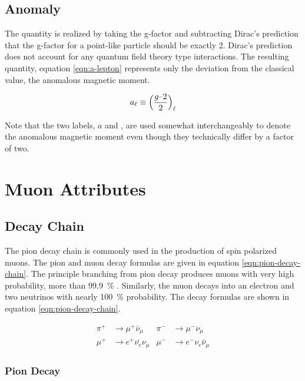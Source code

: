 \subsection{Anomaly}
The quantity \gmtwo is realized by taking the g-factor and subtracting Dirac's prediction that the g-factor for a point-like particle should be exactly 2.  Dirac's prediction does not account for any quantum field theory type interactions.  The resulting \gmtwo quantity, equation \ref{eqn:a-lepton} represents only the deviation from the classical value, the anomalous magnetic moment.

\begin{equation}
\label{eqn:a-lepton}
a_{\ell} \equiv \Big(\frac{g\hbox{--}2}{2} \Big)_\ell
\end{equation}

\noindent
Note that the two labels, $a$ and \gmtwo, are used somewhat interchangeably to denote the anomalous magnetic moment even though they technically differ by a factor of two.

\section{Muon Attributes} \label{sec:muon-attributes}

\subsection{Decay Chain}

The pion decay chain is commonly used in the production of spin polarized muons.  The pion and muon decay formulas are given in equation \ref{eqn:pion-decay-chain}.  The principle branching from pion decay produces muons with very high probability, more than \SI{99.9}{\percent} \cite{pdg-2016}.  Similarly, the muon decays into an electron and two neutrinos with nearly \SI{100}{\percent} probability.  The decay formulas are shown in equation \ref{eqn:pion-decay-chain}.

\begin{align}
\label{eqn:pion-decay-chain}
\pi^+ & \rightarrow \mu^+ \bar{\nu}_\mu  & \pi^- & \rightarrow \mu^- \nu_\mu \\
\mu^+ & \rightarrow e^+ \bar{\nu_e} \nu_\mu  & \mu^- & \rightarrow e^- \nu_e \bar{\nu}_\mu 
\end{align}

\subsubsection{Pion Decay}

